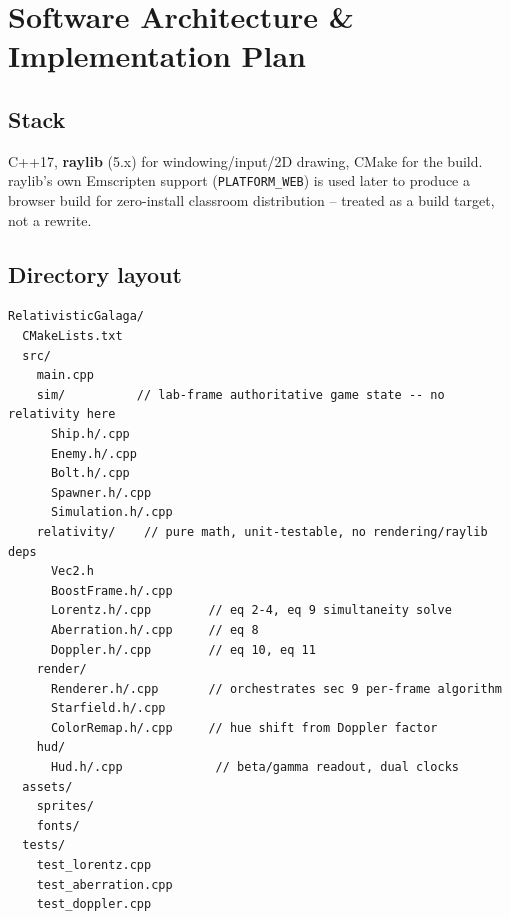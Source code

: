 \documentclass[11pt]{article}
\begin{document}
\section{Software Architecture \& Implementation Plan}
\label{sec:architecture}

\subsection{Stack}
C++17, \textbf{raylib} (5.x) for windowing/input/2D drawing, CMake for the build. raylib's own Emscripten support (\texttt{PLATFORM\_WEB}) is used later to produce a browser build for zero-install classroom distribution -- treated as a build target, not a rewrite.

\subsection{Directory layout}
\begin{lstlisting}
RelativisticGalaga/
  CMakeLists.txt
  src/
    main.cpp
    sim/          // lab-frame authoritative game state -- no relativity here
      Ship.h/.cpp
      Enemy.h/.cpp
      Bolt.h/.cpp
      Spawner.h/.cpp
      Simulation.h/.cpp
    relativity/    // pure math, unit-testable, no rendering/raylib deps
      Vec2.h
      BoostFrame.h/.cpp
      Lorentz.h/.cpp        // eq 2-4, eq 9 simultaneity solve
      Aberration.h/.cpp     // eq 8
      Doppler.h/.cpp        // eq 10, eq 11
    render/
      Renderer.h/.cpp       // orchestrates sec 9 per-frame algorithm
      Starfield.h/.cpp
      ColorRemap.h/.cpp     // hue shift from Doppler factor
    hud/
      Hud.h/.cpp             // beta/gamma readout, dual clocks
  assets/
    sprites/
    fonts/
  tests/
    test_lorentz.cpp
    test_aberration.cpp
    test_doppler.cpp
\end{lstlisting}
\end{document}
